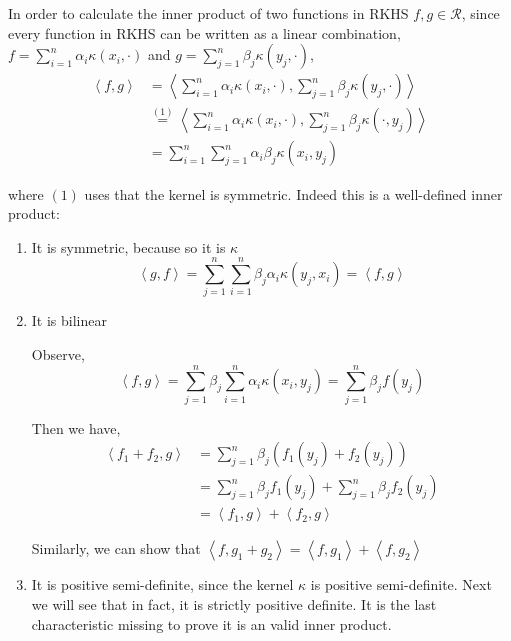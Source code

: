 In order to calculate the inner product of two functions in RKHS $f, g \in \mathcal{R}$, since every function in RKHS can be written as a linear combination, $f=\sum_{i=1}^n \alpha_i \kappa(x_i, \cdot)$ and $g= \sum_{j=1}^n \beta_j \kappa(y_j, \cdot)$, 
\begin{align}\label{eq:inner-product-RKHS}
    \left< f, g\right> 
    &= \left< \sum_{i=1}^n \alpha_i \kappa(x_i,\cdot), \sum_{j=1}^n \beta_j \kappa(y_j, \cdot) \right> \\
    &\stackrel{(1)}{=}  \left< \sum_{i=1}^n \alpha_i \kappa(x_i,\cdot), \sum_{j=1}^n \beta_j \kappa(\cdot, y_j) \right> \\
    &= \sum_{i=1}^n \sum_{j=1}^n \alpha_i \beta_j \kappa(x_i, y_j)  
\end{align}

where $(1)$ uses that the kernel is symmetric. 
Indeed this is a well-defined inner product:
\begin{enumerate}
    \item It is symmetric, because so it is $\kappa$
    $$\left<g,f\right>= \sum_{j=1}^n \sum_{i=1}^n \beta_j \alpha_i \kappa(y_j, x_i) = \left<f,g\right>$$
    \item It is bilinear

    Observe,
    $$\left<f,g \right>= \sum_{j=1}^n \beta_j \sum_{i=1}^n \alpha_i \kappa(x_i, y_j) = \sum_{j=1}^n \beta_j f(y_j) $$

    Then we have,
    \begin{align}
        \left< f_1 + f_2, g\right> &= \sum_{j=1}^n \beta_j (f_1(y_j) + f_2(y_j)) \\
        &= \sum_{j=1}^n \beta_j f_1(y_j) + \sum_{j=1}^n \beta_j f_2(y_j) \\
        &= \left< f_1, g \right> + \left< f_2, g\right>
    \end{align}

    Similarly, we can show that $\left<f, g_1 + g_2 \right> = \left< f,g_1\right> + \left< f,g_2 \right>$
    \item It is positive semi-definite, since the kernel $\kappa$ is positive semi-definite. Next we will see that in fact, it is strictly positive definite. It is the last characteristic missing to prove it is an valid inner product.
\end{enumerate}

